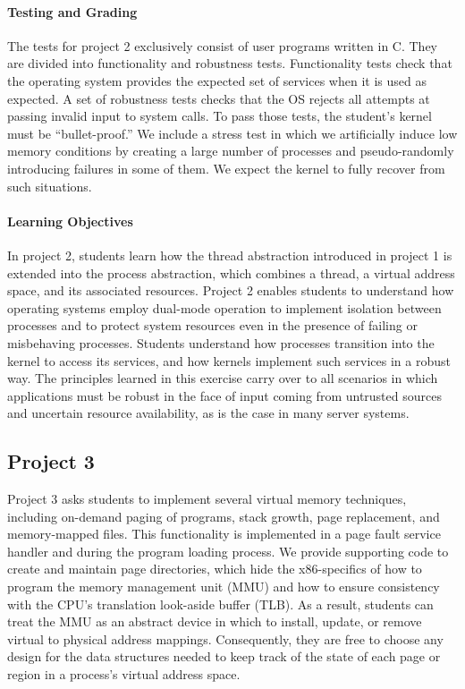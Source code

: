 \paragraph{Testing and Grading}
The tests for project 2 exclusively consist of user programs written in C.
They are divided into functionality and robustness tests.  Functionality tests check that
the operating system provides the expected set of services when it is used as
expected.  A set of robustness tests checks that the OS rejects all attempts at passing
invalid input to system calls.  To pass those tests, the student's kernel must be 
``bullet-proof.'' We include a stress test in which we artificially induce low memory
conditions by creating a large number of processes and pseudo-randomly introducing
failures in some of them.  We expect the kernel to fully recover from such situations.

\paragraph{Learning Objectives}
In project 2, students learn how the thread abstraction introduced in project 1 is 
extended into the process abstraction, which combines a thread, a virtual address space, 
and its associated resources.
Project 2 enables students to understand how operating systems employ dual-mode
operation to implement isolation between processes and to protect system resources
even in the presence of failing or misbehaving processes.  
Students understand how processes transition into the kernel to access its services,
and how kernels implement such services in a robust way.
The principles learned in this exercise carry over to all scenarios
in which applications must be robust in the face of input coming from untrusted 
sources and uncertain resource availability, as is the case in many server systems.

\subsection{Project 3}
Project 3 asks students to implement several virtual memory techniques, including
on-demand paging of programs, stack growth, page replacement, and memory-mapped files.
This functionality is implemented in a page fault service handler and during the
program loading process.
We provide supporting code to create and maintain page directories, which hide
the x86-specifics of how to program the memory management unit (MMU) and how
to ensure consistency with the CPU's translation look-aside buffer (TLB).  
As a result, students can treat the MMU as an abstract device in which to 
install, update, or remove virtual to physical address mappings.
Consequently, they are free to choose any design for the data structures needed to
keep track of the state of each page or region in a process's virtual address 
space.

